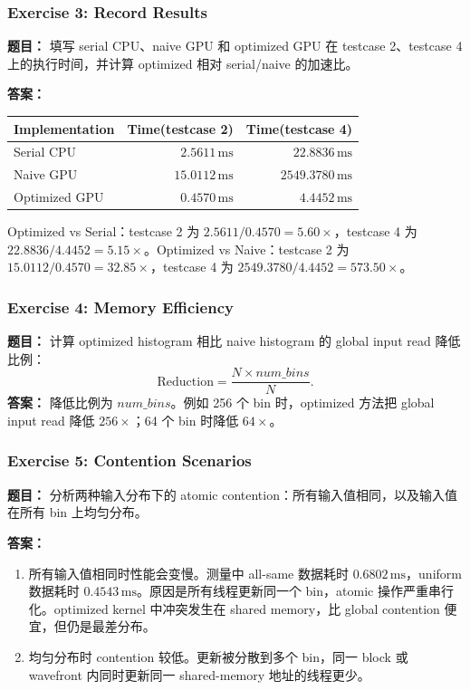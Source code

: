 \documentclass[10pt,a4paper]{article}
\begin{document}
\subsubsection{Exercise 3: Record Results}
\noindent\textbf{题目：} 填写 serial CPU、naive GPU 和 optimized GPU 在 testcase 2、testcase 4 上的执行时间，并计算 optimized 相对 serial/naive 的加速比。

\noindent\textbf{答案：}
\begin{center}
\small
\begin{tabular}{lrr}
\toprule
Implementation & Time(testcase 2) & Time(testcase 4) \\
\midrule
Serial CPU & $2.5611\,\mathrm{ms}$ & $22.8836\,\mathrm{ms}$ \\
Naive GPU & $15.0112\,\mathrm{ms}$ & $2549.3780\,\mathrm{ms}$ \\
Optimized GPU & $0.4570\,\mathrm{ms}$ & $4.4452\,\mathrm{ms}$ \\
\bottomrule
\end{tabular}
\end{center}
Optimized vs Serial：testcase 2 为 $2.5611/0.4570=5.60\times$，testcase 4 为 $22.8836/4.4452=5.15\times$。Optimized vs Naive：testcase 2 为 $15.0112/0.4570=32.85\times$，testcase 4 为 $2549.3780/4.4452=573.50\times$。

\subsubsection{Exercise 4: Memory Efficiency}
\noindent\textbf{题目：} 计算 optimized histogram 相比 naive histogram 的 global input read 降低比例：
\[
\mathrm{Reduction}=\frac{N\times num\_bins}{N}.
\]
\noindent\textbf{答案：} 降低比例为 $num\_bins$。例如 256 个 bin 时，optimized 方法把 global input read 降低 $256\times$；64 个 bin 时降低 $64\times$。

\subsubsection{Exercise 5: Contention Scenarios}
\noindent\textbf{题目：} 分析两种输入分布下的 atomic contention：所有输入值相同，以及输入值在所有 bin 上均匀分布。

\noindent\textbf{答案：}
\begin{enumerate}[label=\arabic*.]
\item 所有输入值相同时性能会变慢。测量中 all-same 数据耗时 $0.6802\,\mathrm{ms}$，uniform 数据耗时 $0.4543\,\mathrm{ms}$。原因是所有线程更新同一个 bin，atomic 操作严重串行化。optimized kernel 中冲突发生在 shared memory，比 global contention 便宜，但仍是最差分布。
\item 均匀分布时 contention 较低。更新被分散到多个 bin，同一 block 或 wavefront 内同时更新同一 shared-memory 地址的线程更少。
\end{enumerate}
\end{document}
